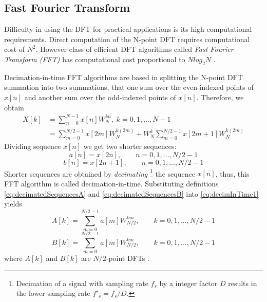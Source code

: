 \documentclass[twoside]{ctuthesis}
\theoremstyle{plain}
\theoremstyle{definition}
\theoremstyle{note}
\begin{document}
\subsection{Fast Fourier Transform}
\label{sec:FFT}
Difficulty in using the DFT for practical applications is its high computational requirements. Direct computation of the N-point DFT requires computational cost of $N^2$. However class of efficient DFT algorithms called \textit{Fast Fourier Transform (FFT)} has computational cost proportional to $Nlog_{2}N$ \cite{cite:RT_DSP,cite:3}.
\par 
Decimation-in-time FFT algorithms are based in splitting the N-point DFT summation into two summations, that one sum over the even-indexed points of $x[n]$ and another sum over the odd-indexed points of $x[n]$.
Therefore, we obtain
\begin{equation} \label{eq:decimInTime1}
\begin{aligned}
X[k] &= \sum_{n=0}^{N-1}x[n]W^{kn}_{N}, \; k=0,1,...,N-1\\
     &= \sum_{m=0}^{N/2-1}x[2m]W^{k(2m)}_{N} + W^{k}_{N}\sum_{m=0}^{N/2-1}x[2m+1]W^{k(2m)}_{N}
     \end{aligned}
\end{equation}
Dividing sequence $x[n]$ we get two shorter sequences:
\begin{equation} \label{eq:decimatedSequencesA}
a[n]=x[2n],\qquad n=0, 1, ..., N/2 -1
\end{equation}
\begin{equation} \label{eq:decimatedSequencesB}
b[n]=x[2n+1],\qquad n=0, 1, ..., N/2 -1
\end{equation}
Shorter sequences are obtained by \textit{decimating}
\footnote{Decimation of a signal with sampling rate $f_{s}$ by a integer factor $D$ results in the lower sampling rate $f'_{s}=f_{s}/D$.}
 the sequence $x[n]$, thus, this FFT algorithm is called decimation-in-time.
Substituting definitions \ref{eq:decimatedSequencesA} and \ref{eq:decimatedSequencesB} into \ref{eq:decimInTime1} yields
\begin{equation} \label{eq:fft2_A}
A[k]=\sum_{m=0}^{N/2-1}a[m]W^{km}_{N/2},\qquad k=0, 1, ..., N/2 -1
\end{equation}
\begin{equation} \label{eq:fft2_B}
B[k]=\sum_{m=0}^{N/2-1}a[m]W^{km}_{N/2},\qquad k=0, 1, ..., N/2 -1
\end{equation}
where $A[k]$ and $B[k]$ are $N/2$-point DFTs \cite{cite:3,cite:2}.
\end{document}
